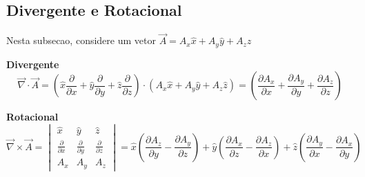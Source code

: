 \documentclass[11pt]{article}
\theoremstyle{definition}
\begin{document}
\subsection{Divergente e Rotacional}
Nesta subsecao, considere um vetor $\vec{A} = A_{x}\hat{x}+A_{y}\hat{y}+A_{z}\hat{z}$
\begin{shaded}
\textbf{Divergente} \newline
\begin{equation}
\vec{\nabla}\cdot \vec{A} = \left(\hat{x}\frac{\partial}{\partial x}+\hat{y}\frac{\partial}{\partial y}+\hat{z}\frac{\partial}{\partial z}\right) \cdot (A_{x}\hat{x}+A_{y}\hat{y}+A_{z}\hat{z})
                          = \left(\frac{\partial A_{x}}{\partial x}+\frac{\partial A_{y}}{\partial y}+\frac{\partial A_{z}}{\partial z}\right)
\end{equation}
\end{shaded}

\begin{shaded}
    \textbf{Rotacional} \newline
    \begin{equation}
    \vec{\nabla}\times \vec{A} = \begin{vmatrix}
        \hat{x} & \hat{y} & \hat{z}\\ 
        \frac{\partial}{\partial x} & \frac{\partial}{\partial y} & \frac{\partial}{\partial z}\\
        A_{x} & A_{y} & A_{z} 
   \end{vmatrix}
    = \hat{x}\left(\frac{\partial A_{z}}{\partial y}-\frac{\partial A_{y}}{\partial z}\right)+\hat{y}\left(\frac{\partial A_{x}}{\partial z}-\frac{\partial A_{z}}{\partial x}\right)+\hat{z}\left(\frac{\partial A_{y}}{\partial x}-\frac{\partial A_{x}}{\partial y}\right)
    \end{equation}
\end{shaded}
\end{document}
